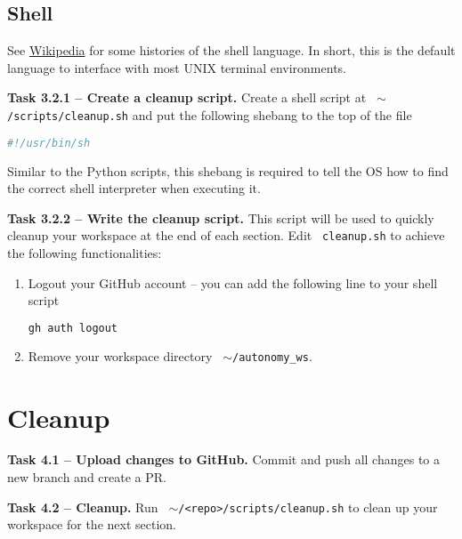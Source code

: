\documentclass{article}
\def\code#1{\texttt{\color{magenta} #1}}
\begin{document}
\subsection{Shell}\label{sec:shell}
See \href{https://en.wikipedia.org/wiki/Shell_script}{Wikipedia} for some histories
of the shell language. In short, this is the default language to interface with most
UNIX terminal environments.

{\bf Task 3.2.1 -- Create a cleanup script.} Create a shell script at \code{$\sim$/scripts/cleanup.sh}
and put the following shebang to the top of the file
\begin{lstlisting}[language=sh, numbers=none]
#!/usr/bin/sh
\end{lstlisting}
Similar to the Python scripts, this shebang is required to tell the OS how to find the
correct shell interpreter when executing it.

{\bf Task 3.2.2 -- Write the cleanup script.} This script will be used to quickly cleanup
your workspace at the end of each section. Edit \code{cleanup.sh} to achieve
the following functionalities:

\begin{enumerate}
\item Logout your GitHub account -- you can add the following line to your shell script
\begin{lstlisting}[language=sh, numbers=none]
gh auth logout
\end{lstlisting}

\item Remove your workspace directory \code{$\sim$/autonomy\_ws}.
\end{enumerate}

\section{Cleanup}

{\bf Task 4.1 -- Upload changes to GitHub.} Commit and push all changes to a new branch
and create a PR.

{\bf Task 4.2 -- Cleanup.} Run \code{$\sim$/<repo>/scripts/cleanup.sh} to clean up
your workspace for the next section.
\end{document}
